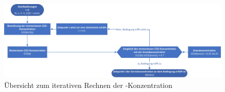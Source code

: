 \begin{center}
	\begin{figure}[h!]
		\centering
		\includegraphics[width=1.1\textwidth]{img/iterativ}
		\caption{Übersicht zum iterativen Rechnen der -Konzentration}
\end{figure}
\end{center}

\FloatBarrier

\newpage

